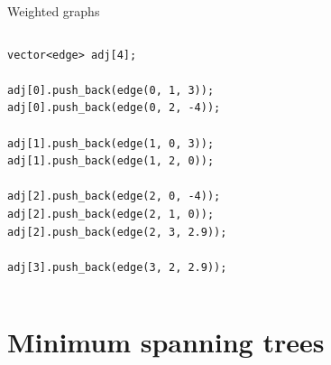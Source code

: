 \documentclass{beamer}
\begin{document}
\begin{frame}{Weighted graphs}
    \begin{columns}[T]
        \begin{column}{.4\textwidth}
            \begin{verbatim}
vector<edge> adj[4];

adj[0].push_back(edge(0, 1, 3));
adj[0].push_back(edge(0, 2, -4));

adj[1].push_back(edge(1, 0, 3));
adj[1].push_back(edge(1, 2, 0));

adj[2].push_back(edge(2, 0, -4));
adj[2].push_back(edge(2, 1, 0));
adj[2].push_back(edge(2, 3, 2.9));

adj[3].push_back(edge(3, 2, 2.9));

            \end{verbatim}
        \end{column}%
        \hfill%
        \begin{column}{.6\textwidth}
            \begin{figure}
            \end{figure}
        \end{column}%
    \end{columns}
\end{frame}

\section*{Minimum spanning trees}
\end{document}
